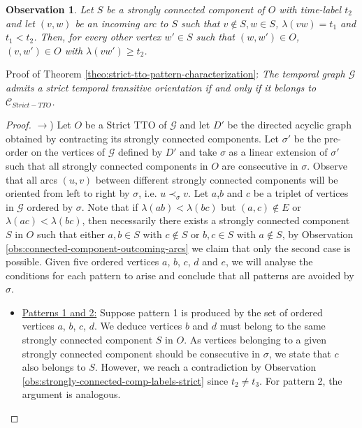 \documentclass[runningheads]{llncs}
\newtheorem{obs}{Observation}
\begin{document}
\begin{obs}
Let $S$ be a strongly connected component of $O$ with time-label $t_{2}$ and let $(v,w)$ be an incoming arc to $S$ such that $v \notin S, w \in S$, $\lambda(vw) = t_{1}$ and $t_{1} < t_{2}$. Then, for every other vertex $w' \in S$ such that $(w,w') \in O$, $(v,w') \in O$ with $\lambda(vw') \geq t_{2}$.
\label{obs:connected-component-incoming-arcs}
\end{obs}




Proof of Theorem \ref{theo:strict-tto-pattern-characterization}: \textit{The temporal graph $\mathcal{G}$ admits a strict temporal transitive orientation if and only if it belongs to $\mathcal{C}_{Strict-TTO}$.}


\begin{proof}

$\rightarrow$)
Let $O$ be a Strict TTO of $\mathcal{G}$ and let $D'$ be the directed acyclic graph obtained by contracting its strongly connected components. Let $\sigma'$ be the pre-order on the vertices of $\mathcal{G}$ defined by $D'$ and take $\sigma$ as a linear extension of $\sigma'$ such that all strongly connected components in $O$ are consecutive in $\sigma$. Observe that all arcs $(u,v)$ between different strongly connected components will be oriented from left to right by $\sigma$, i.e. $u \prec_{\sigma} v$. Let $a$,$b$ and $c$ be a triplet of vertices in $\mathcal{G}$ ordered by $\sigma$. Note that if $\lambda(ab) < \lambda(bc)$ but $(a,c) \notin E$ or $\lambda(ac) < \lambda(bc)$, then necessarily there exists a strongly connected component $S$ in $O$ such that either $a,b \in S$ with $c \notin S$ or $b,c \in S$ with $a \notin S$, by Observation \ref{obs:connected-component-outcoming-arcs} we claim that only the second case is possible. Given five ordered vertices $a$, $b$, $c$, $d$ and $e$, we will analyse the conditions for each pattern to arise and conclude that all patterns are avoided by $\sigma$.

\begin{itemize}
\item \underline{Patterns 1 and 2:}
Suppose pattern 1 is produced by the set of ordered vertices $a$, $b$, $c$, $d$. We deduce vertices $b$ and $d$ must belong to the same strongly connected component $S$ in $O$. As vertices belonging to a given strongly connected component should be consecutive in $\sigma$, we state that $c$ also belongs to $S$. However, we reach a contradiction by Observation \ref{obs:strongly-connected-comp-labels-strict} since $t_2 \neq t_3$. For pattern 2, the argument is analogous.


\end{itemize}
\end{proof}
\end{document}
